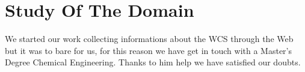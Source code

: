 \chapter{\textbf{Study Of The Domain}}
We started our work collecting informations about the WCS through the Web but it was to bare for us, for this reason we have get in touch with a Master’s Degree Chemical Engineering. Thanks to him help we have satisfied our doubts.
